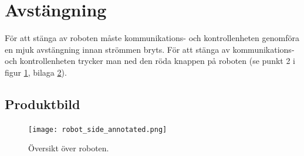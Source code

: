 \documentclass[a4paper,11pt]{article}
\begin{document}
\section{Avstängning}
För att stänga av roboten måste kommunikations- och kontrollenheten genomföra en mjuk avstängning innan strömmen bryts. För att stänga av kommunikations- och kontrollenheten trycker man ned den röda knappen på roboten (se punkt 2 i figur \ref{fig:robot_overview}, bilaga \ref{app:picture}).

\clearpage
\begin{appendices}
\section{Produktbild}\label{app:picture}
 \begin{figure}[h!]
     \centering
     \texttt{[image: robot\_side\_annotated.png]}
     \caption{Översikt över roboten.}
     \label{fig:robot_overview}
 \end{figure}
\end{appendices}
\end{document}

